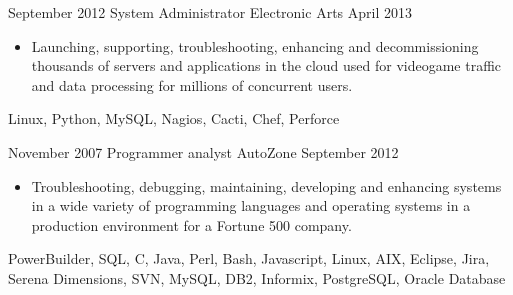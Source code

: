 \begin{experiences}
    \emptySeparator

    \experience
        {September 2012}
        {System Administrator}
        {Electronic Arts}
        {April 2013}
        {
            \begin{itemize}
                \item Launching, supporting, troubleshooting, enhancing and 
                    decommissioning thousands of servers and applications in 
                    the cloud used for videogame traffic and data processing 
                    for millions of concurrent users.
            \end{itemize}
        }
        {
            Linux,
            Python,
            MySQL,
            Nagios,
            Cacti,
            Chef,
            Perforce
        }

    \emptySeparator

    \experience
        {November 2007}
        {Programmer analyst}
        {AutoZone}
        {September 2012}
        {
            \begin{itemize}
                \item Troubleshooting, debugging, maintaining, developing and 
                    enhancing systems in a wide variety of programming 
                    languages and operating systems in a production environment 
                    for a Fortune 500 company.
            \end{itemize}
        }
        {
            PowerBuilder, 
            SQL, 
            C, 
            Java, 
            Perl, 
            Bash, 
            Javascript, 
            Linux, 
            AIX, 
            Eclipse, 
            Jira, 
            Serena Dimensions, 
            SVN, 
            MySQL, 
            DB2, 
            Informix, 
            PostgreSQL, 
            Oracle Database
        }

\end{experiences}
